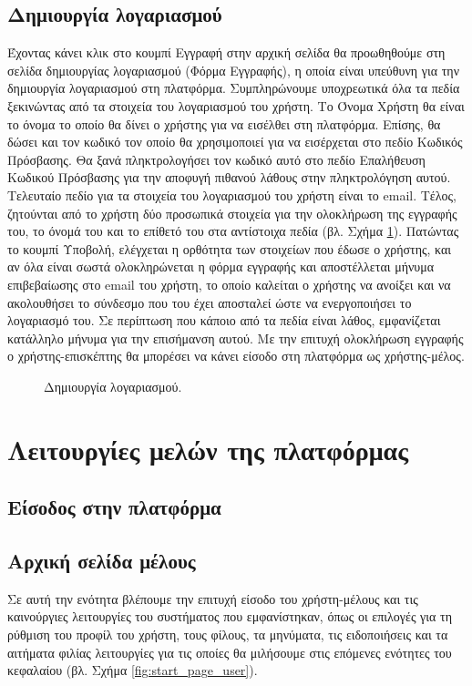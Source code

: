 \subsection{Δημιουργία λογαριασμού}
Έχοντας κάνει κλικ στο κουμπί Εγγραφή στην αρχική σελίδα θα προωθηθούμε στη σελίδα δημιουργίας λογαριασμού (Φόρμα Εγγραφής), η οποία είναι υπεύθυνη για την δημιουργία λογαριασμού στη πλατφόρμα. Συμπληρώνουμε υποχρεωτικά όλα τα πεδία ξεκινώντας από τα στοιχεία του λογαριασμού του χρήστη. Το Όνομα Χρήστη θα είναι το όνομα το οποίο θα δίνει ο χρήστης για να εισέλθει στη πλατφόρμα. Επίσης, θα δώσει και τον κωδικό τον οποίο θα χρησιμοποιεί για να εισέρχεται στο πεδίο Κωδικός Πρόσβασης. Θα ξανά πληκτρολογήσει τον κωδικό αυτό στο πεδίο Επαλήθευση Κωδικού Πρόσβασης για την αποφυγή πιθανού λάθους στην πληκτρολόγηση αυτού. Τελευταίο πεδίο για τα στοιχεία του λογαριασμού του χρήστη είναι το \textlatin{email.} Τέλος, ζητούνται από το χρήστη δύο προσωπικά στοιχεία για την ολοκλήρωση της εγγραφής του, το όνομά του και το επίθετό του στα αντίστοιχα πεδία (βλ. Σχήμα \ref{fig:register}). Πατώντας το κουμπί Υποβολή, ελέγχεται η ορθότητα των στοιχείων που έδωσε ο χρήστης, και αν όλα είναι σωστά ολοκληρώνεται η φόρμα εγγραφής και αποστέλλεται μήνυμα επιβεβαίωσης στο \textlatin{email} του χρήστη, το οποίο καλείται ο χρήστης να ανοίξει και να ακολουθήσει το σύνδεσμο που του έχει αποσταλεί ώστε να ενεργοποιήσει το λογαριασμό του. Σε περίπτωση που κάποιο από τα πεδία είναι λάθος, εμφανίζεται κατάλληλο μήνυμα για την επισήμανση αυτού. Με την επιτυχή ολοκλήρωση εγγραφής ο χρήστης-επισκέπτης θα μπορέσει να κάνει είσοδο στη πλατφόρμα ως χρήστης-μέλος.

\begin{figure}[tbh]
\centering
\caption{Δημιουργία λογαριασμού.}
\label{fig:register}
\end{figure}

\section{Λειτουργίες μελών της πλατφόρμας}

\subsection{Είσοδος στην πλατφόρμα}

\subsection{Αρχική σελίδα μέλους}
Σε αυτή την ενότητα βλέπουμε την επιτυχή είσοδο του χρήστη-μέλους και τις καινούργιες λειτουργίες του συστήματος που εμφανίστηκαν, όπως οι επιλογές για τη ρύθμιση του προφίλ του χρήστη, τους φίλους, τα μηνύματα, τις ειδοποιήσεις και τα αιτήματα φιλίας λειτουργίες για τις οποίες θα μιλήσουμε στις επόμενες ενότητες του κεφαλαίου (βλ. Σχήμα \ref{fig:start_page_user}). 

